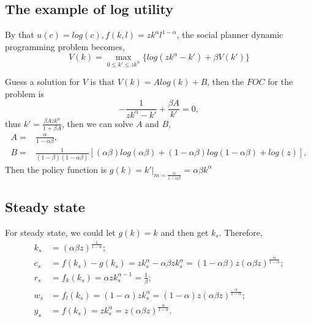 \documentclass[12pt,notitlepage]{article}%
\numberwithin{equation}{section}
\begin{document}
\subsection{The example of log utility}
By that $u(c)=log(c), f(k,l)=zk^{\alpha}l^{1-\alpha}$, the social planner dynamic programming problem becomes,
\begin{equation*}
V(k)=\max_{0\leq k'\leq zk^{\alpha}} \{log(zk^{\alpha}-k')+\beta V(k')\}
\end{equation*}

Guess a solution for $V$ is that $V(k)=Alog(k)+B$, then the $FOC$ for the problem is $$-\frac{1}{zk^{\alpha}-k'}+\frac{\beta A}{k'}=0,$$ thus $k'=\frac{\beta Azk^{\alpha}}{1+\beta A}$, then we can solve $A$ and $B$,
\begin{equation*}
\begin{split}
A=&\frac{\alpha}{1-\alpha \beta},\\
B=&\frac{1}{(1-\beta)(1-\alpha \beta)}[(\alpha \beta)log(\alpha \beta)+(1-\alpha \beta)log(1-\alpha \beta)+log(z)],
\end{split}
\end{equation*}
Then the policy function is $g(k)=k'|_{m=\frac{\alpha}{1-\alpha \beta}}=\alpha \beta k^{\alpha}$


\subsection{Steady state}
For steady state, we could let $g(k)=k$ and then get $k_s$. Therefore, 
\begin{equation*}
\begin{split}
k_s&=(\alpha \beta z)^{\frac{1}{1-\alpha}};\\
c_s&=f(k_s)-g(k_s)=zk_s^{\alpha}-\alpha \beta zk_s^{\alpha}=(1-\alpha \beta)z(\alpha \beta z)^{\frac{\alpha}{1-\alpha}};\\
r_s&=f_k(k_s)=\alpha zk_s^{\alpha -1}=\frac{1}{\beta};\\
w_s&=f_l(k_s)=(1-\alpha) zk_s^{\alpha}=(1-\alpha) z(\alpha \beta z)^{\frac{\alpha}{1-\alpha}};\\
y_s&=f(k_s)=zk_s^{\alpha}=z(\alpha \beta z)^{\frac{\alpha}{1-\alpha}}.
\end{split}
\end{equation*}
\end{document}
